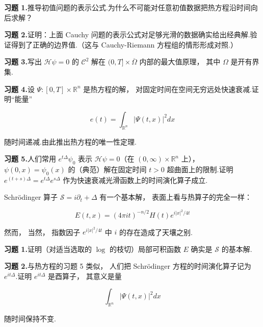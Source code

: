 \noindent\textbf{习题 1.}\quad 推导初值问题的表示公式.为什么不可能对任意初值数据把热方程沿时间向后求解？

\noindent\textbf{习题 2.}\quad 证明：上面 Cauchy 问题的表示公式对足够光滑的数据确实给出经典解.验证得到了正确的边界值.（这与 Cauchy-Riemann 方程组的情形形成对照.）

\noindent\textbf{习题 3.}\quad 写出 $\mathcal{H}\psi = 0$ 的 $\mathcal{C}^{2}$ 解在 $(0, T] \times \overline{\Omega}$ 内部的最大值原理， 其中 $\Omega$ 是开有界集.

\noindent\textbf{习题 4.}\quad 设 $\Psi : [0, T] \times \mathbb{R}^{n}$ 是热方程的解， 对固定时间在空间无穷远处快速衰减.证明``能量''

\[
e(t) = \int_{\mathbb{R}^{n}}|\Psi(t, x)|^{2}dx
\]

随时间递减.由此推出热方程的唯一性定理.

\noindent\textbf{习题 5.}\quad 人们常用 $e^{t\Delta}\psi_{0}$ 表示 $\mathcal{H}\psi = 0$（在 $(0, \infty) \times \mathbb{R}^{n}$ 上）， $\psi(0, x) = \psi_{0}(x)$ 的（典范）解在固定时间 $t > 0$ 超曲面上的限制.证明 $e^{(t+s)\Delta} = e^{t\Delta}e^{s\Delta}$ 作为快速衰减光滑函数上的时间演化算子成立.


Schrödinger 算子 $\mathcal{S} = i\partial_{t} + \Delta$ 有一个基本解， 表面上看与热算子的完全一样：

\begin{equation}
E(t, x) = (4\pi it)^{-n/2}H(t)e^{i|x|^{2}/4t}\label{eq:c4-154}
\end{equation}

然而， 当然， 指数因子 $e^{i|x|^{2}/4t}$ 中 $i$ 的存在造成了天壤之别.

\noindent\textbf{习题 1.}\quad 证明（对适当选取的 $\log$ 的枝切）局部可积函数 $E$ 确实是 $\mathcal{S}$ 的基本解.

\noindent\textbf{习题 2.}\quad 与热方程的习题 5 类似， 人们把 Schrödinger 方程的时间演化算子记为 $e^{it\Delta}$.证明 $e^{it\Delta}$ 是酉算子， 其意义是量

\[
\int_{\mathbb{R}^{n}}|\Psi(t, x)|^{2}dx
\]

随时间保持不变.